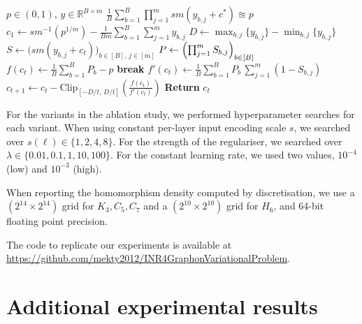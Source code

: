 \documentclass{article}
\theoremstyle{plain}
\theoremstyle{definition}
\theoremstyle{remark}
\newcommand*{\R}{\mathbb{R}}
\begin{document}
\begin{algorithm}
  \caption{Homomorphism-Density Constraint Solver}\label{alg:cap-hom}
  \begin{algorithmic}
    \REQUIRE $p \in (0,1)$, $y \in \R^{B \times m}$
    \ENSURE $\frac{1}{B} \sum_{b=1}^B \prod_{j=1}^m \mathit{sm}(y_{b,j} + c^*) \approxeq p$
    \STATE $c_1 \gets \mathit{sm}^{-1}(p^{1/m}) - \frac{1}{Bm} \sum_{b=1}^B \sum_{j=1}^m y_{b,j}$ \hfill {}
    \STATE $D \gets \max_{b,j}\{y_{b,j}\} - \min_{b,j}\{y_{b,j}\}$ \hfill {}
      \STATE $S \gets \bigl(\mathit{sm}(y_{b,j} + c_t)\bigr)_{b \in [B],\, j \in [m]}$
      \STATE $P \gets \Bigl(\prod_{j=1}^m S_{b,j}\Bigr)_{b \in [B]}$
      \STATE $f(c_t) \gets \frac{1}{B} \sum_{b=1}^B P_b - p$
        \STATE \textbf{break}
      \ENDIF
      \STATE $f'(c_t) \gets \frac{1}{B} \sum_{b=1}^B P_b\,\sum_{j=1}^m (1 - S_{b,j})$
      \STATE $c_{t+1} \gets c_t - \mathrm{Clip}_{[-D/t,\, D/t]}\left(\frac{f(c_t)}{f'(c_t)}\right)$
    \ENDFOR
    \STATE \textbf{Return} $c_t$
  \end{algorithmic}
\end{algorithm}

For the variants in the ablation study, we performed hyperparameter searches for each variant.
When using constant per-layer input encoding scale $s$, we searched over $s(\ell) \in \{1, 2, 4, 8\}$.
For the strength of the regulariser, we searched over $\lambda \in \{0.01, 0.1, 1, 10, 100\}$.
For the constant learning rate, we used two values, $10^{-4}$ (low) and $10^{-3}$ (high).

When reporting the homomorphism density computed by discretisation, we use a $(2^{14} \times 2^{14})$ grid for $K_3, C_5, C_7$ and a $(2^{10} \times 2^{10})$ grid for $H_6$, and 64-bit floating point precision.

The code to replicate our experiments is available at \url{https://github.com/mekty2012/INR4GraphonVariationalProblem}.


\section{Additional experimental results}
\label{sec:addexperiments}
\end{document}
